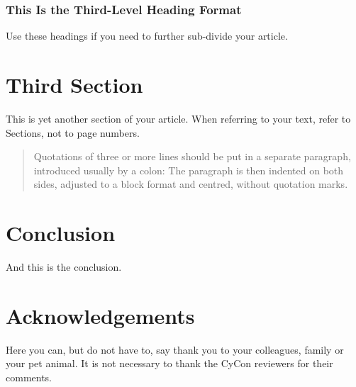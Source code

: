 \documentclass[11pt]{article}
\begin{document}
\subsubsection{This Is the Third-Level Heading Format}
Use these headings if you need to further sub-divide your article.

\section{Third Section}
This is yet another section of your article. When referring to your text, refer to Sections, not to page numbers.

\begin{quote}
Quotations of three or more lines should be put in a separate paragraph, introduced usually by a colon: The paragraph is then indented on both sides, adjusted to a block format and centred, without quotation marks.
\end{quote}

\section{Conclusion}
And this is the conclusion.

\section*{Acknowledgements}
Here you can, but do not have to, say thank you to your colleagues, family or your pet animal. It is not necessary to thank the CyCon reviewers for their comments.
\end{document}
